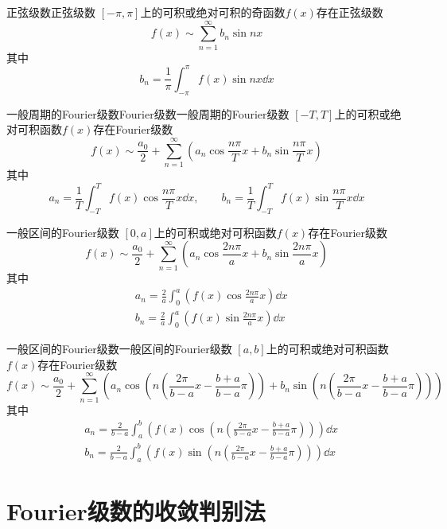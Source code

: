 \documentclass[lang = cn, scheme = chinese, thmcnt = section]{elegantbook}
\begin{document}
\begin{theorem}{正弦级数}{正弦级数}
	$[-\pi,\pi]$上的可积或绝对可积的奇函数$f(x)$存在正弦级数
	$$
	f(x)\sim\sum_{n=1}^{\infty}b_n\sin nx
	$$
	其中
	$$
	b_n=\frac{1}{\pi}\int_{-\pi}^{\pi}f(x)\sin n x\dd x
	$$
\end{theorem}

\begin{theorem}{一般周期的Fourier级数Fourier级数}{一般周期的Fourier级数}
	$[-T,T]$上的可积或绝对可积函数$f(x)$存在Fourier级数
	$$
	f(x)\sim\frac{a_0}{2}+\sum_{n=1}^{\infty}\left(a_n\cos \frac{n\pi}{T}x+b_n\sin \frac{n\pi}{T}x\right)
	$$
	其中
	$$
	a_n=\frac{1}{T}\int_{-T}^{T}f(x)\cos \frac{n\pi}{T} x\dd x,\qquad 
	b_n=\frac{1}{T}\int_{-T}^{T}f(x)\sin \frac{n\pi}{T} x\dd x
	$$
\end{theorem}

\begin{theorem}{一般区间的Fourier级数}
	$[0,a]$上的可积或绝对可积函数$f(x)$存在Fourier级数
	$$
	f(x)\sim\frac{a_0}{2}+\sum_{n=1}^{\infty}
	\left(
	a_n\cos\frac{2n\pi}{a}x
	+b_n\sin\frac{2n\pi}{a}x
	\right)
	$$
	其中
	\begin{align*}
		& a_n=\frac{2}{a}\int_{0}^{a}\left(f(x)\cos\frac{2n\pi}{a}x\right)\dd x\\
		& b_n=\frac{2}{a}\int_{0}^{a}\left(f(x)\sin\frac{2n\pi}{a}x\right)\dd x
	\end{align*}
\end{theorem}

\begin{theorem}{一般区间的Fourier级数}{一般区间的Fourier级数}
	$[a,b]$上的可积或绝对可积函数$f(x)$存在Fourier级数
	$$
	f(x)\sim\frac{a_0}{2}+\sum_{n=1}^{\infty}
	\left(
	a_n\cos\left(n\left(\frac{2\pi}{b-a}x-\frac{b+a}{b-a}\pi\right)\right)
	+b_n\sin\left(n\left(\frac{2\pi}{b-a}x-\frac{b+a}{b-a}\pi\right)\right)
	\right)
	$$
	其中
	\begin{align*}
		& a_n=\frac{2}{b-a}\int_{a}^{b}\left(f(x)\cos\left(n\left(\frac{2\pi}{b-a}x-\frac{b+a}{b-a}\pi\right)\right)\right)\dd x\\
		& b_n=\frac{2}{b-a}\int_{a}^{b}\left(f(x)\sin\left(n\left(\frac{2\pi}{b-a}x-\frac{b+a}{b-a}\pi\right)\right)\right)\dd x
	\end{align*}
\end{theorem}

\section{Fourier级数的收敛判别法}
\end{document}
